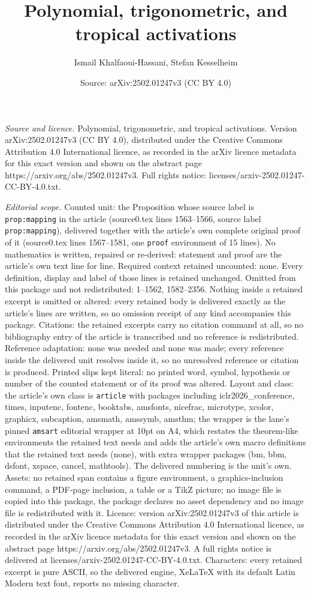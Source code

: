 \documentclass[10pt,a4paper]{amsart}
\title[Polynomial, trigonometric, and tropical activations]{Polynomial, trigonometric, and tropical activations}
\author{Ismail Khalfaoui-Hassani, Stefan Kesselheim}
\date{Source: arXiv:2502.01247v3 (CC BY 4.0)}
\begin{document}
\maketitle

\noindent\emph{Source and licence.} Polynomial, trigonometric, and tropical activations. Version arXiv:2502.01247v3 (CC BY 4.0), distributed under the Creative Commons Attribution 4.0 International licence, as recorded in the arXiv licence metadata for this exact version and shown on the abstract page https://arxiv.org/abs/2502.01247v3. Full rights notice: licenses/arxiv-2502.01247-CC-BY-4.0.txt.\par\smallskip

\noindent\textit{Editorial scope.} Counted unit: the Proposition whose source label is \texttt{prop:mapping} in the article (source0.tex lines 1563--1566, source label \texttt{prop:mapping}), delivered together with the article's own complete original proof of it (source0.tex lines 1567--1581, one \texttt{proof} environment of 15 lines). No mathematics is written, repaired or re-derived: statement and proof are the article's own text line for line. Required context retained uncounted: none. Every definition, display and label of those lines is retained unchanged. Omitted from this package and not redistributed: 1--1562, 1582--2356. Nothing inside a retained excerpt is omitted or altered: every retained body is delivered exactly as the article's lines are written, so no omission receipt of any kind accompanies this package. Citations: the retained excerpts carry no citation command at all, so no bibliography entry of the article is transcribed and no reference is redistributed. Reference adaptation: none was needed and none was made; every reference inside the delivered unit resolves inside it, so no unresolved reference or citation is produced. Printed slips kept literal: no printed word, symbol, hypothesis or number of the counted statement or of its proof was altered. Layout and class: the article's own class is \texttt{article} with packages including iclr2026\_conference, times, inputenc, fontenc, booktabs, amsfonts, nicefrac, microtype, xcolor, graphicx, subcaption, amsmath, amssymb, amsthm; the wrapper is the lane's pinned \texttt{amsart} editorial wrapper at 10pt on A4, which restates the theorem-like environments the retained text needs and adds the article's own macro definitions that the retained text needs (none), with extra wrapper packages (bm, bbm, dsfont, xspace, cancel, mathtools). The delivered numbering is the unit's own. Assets: no retained span contains a figure environment, a graphics-inclusion command, a PDF-page inclusion, a table or a TikZ picture; no image file is copied into this package, the package declares no asset dependency and no image file is redistributed with it. Licence: version arXiv:2502.01247v3 of this article is distributed under the Creative Commons Attribution 4.0 International licence, as recorded in the arXiv licence metadata for this exact version and shown on the abstract page https://arxiv.org/abs/2502.01247v3. A full rights notice is delivered at licenses/arxiv-2502.01247-CC-BY-4.0.txt. Characters: every retained excerpt is pure ASCII, so the delivered engine, XeLaTeX with its default Latin Modern text font, reports no missing character.
\end{document}
